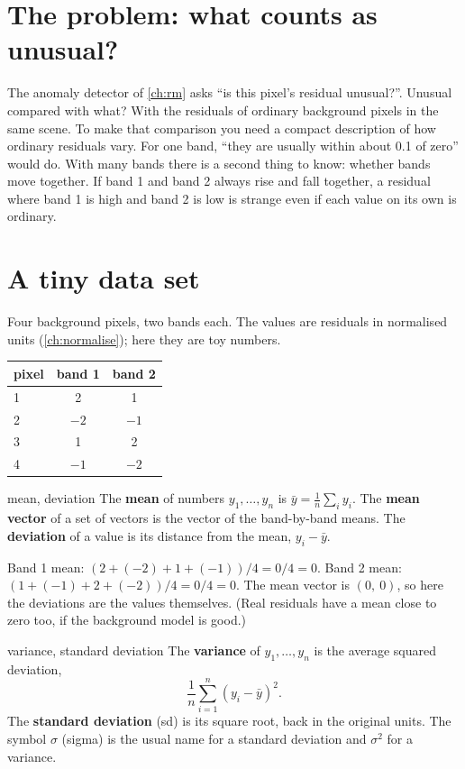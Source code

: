 \documentclass[11pt,a4paper,oneside,openany]{book}
\begin{document}
\section{The problem: what counts as unusual?}

The anomaly detector of \cref{ch:rm} asks ``is this pixel's residual unusual?''. Unusual compared with what? With the
residuals of ordinary background pixels in the same scene. To make that comparison you need a compact description of how
ordinary residuals vary. For one band, ``they are usually within about 0.1 of zero'' would do. With many bands there is a
second thing to know: whether bands move together. If band 1 and band 2 always rise and fall together, a residual where
band 1 is high and band 2 is low is strange even if each value on its own is ordinary.

\section{A tiny data set}

Four background pixels, two bands each. The values are residuals in normalised units (\cref{ch:normalise}); here they are
toy numbers.

\begin{center}
\begin{tabular}{@{}lcc@{}}
\toprule
pixel & band 1 & band 2\\
\midrule
1 & 2 & 1\\
2 & $-2$ & $-1$\\
3 & 1 & 2\\
4 & $-1$ & $-2$\\
\bottomrule
\end{tabular}
\end{center}

\begin{defn}{mean, deviation}
The \textbf{mean} of numbers $y_1,\dots,y_n$ is $\bar y=\frac1n\sum_i y_i$. The \textbf{mean vector} of a set of vectors is
the vector of the band-by-band means. The \textbf{deviation} of a value is its distance from the mean, $y_i-\bar y$.
\end{defn}

Band 1 mean: $(2+(-2)+1+(-1))/4=0/4=0$. Band 2 mean: $(1+(-1)+2+(-2))/4=0/4=0$. The mean vector is $(0,\ 0)$, so here the
deviations are the values themselves. (Real residuals have a mean close to zero too, if the background model is good.)

\begin{defn}{variance, standard deviation}
The \textbf{variance} of $y_1,\dots,y_n$ is the average squared deviation,
\[
  \frac1n\sum_{i=1}^n (y_i-\bar y)^2 .
\]
The \textbf{standard deviation} (sd) is its square root, back in the original units. The symbol $\sigma$ (sigma) is the usual
name for a standard deviation and $\sigma^2$ for a variance.
\end{defn}
\end{document}
